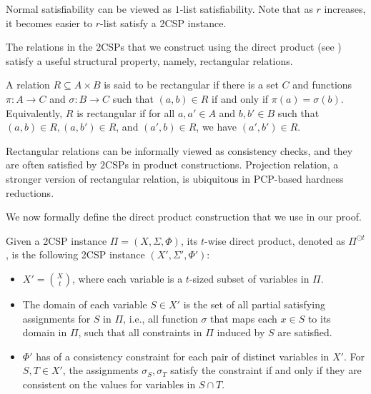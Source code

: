 Normal satisfiability can be viewed as $1$-list satisfiability. Note that as $r$ increases, it becomes easier to $r$-list satisfy a 2CSP instance. 

The relations in the $2$CSPs that we construct using the direct product (see ) satisfy a useful structural property, namely, rectangular relations. 
\begin{definition}\label{def:rect}
    A relation $R \subseteq A \times B$ is said to be rectangular if there is a set $C$ and functions $\pi: A \to C$ and $\sigma: B \to C$ such that $(a,b) \in R$ if and only if $\pi(a)=\sigma(b)$. Equivalently, $R$ is rectangular if for all $a,a' \in A$ and $b,b' \in B$ such that $(a,b)\in R, (a,b')\in R$, and $(a',b) \in R$, we have $(a',b')\in R$.
\end{definition}

Rectangular relations can be informally viewed as consistency checks, and they are often satisfied by $2$CSPs in product constructions. Projection relation, a stronger version of rectangular relation, is ubiquitous in PCP-based hardness reductions.

We now formally define the direct product construction that we use in our proof. 
\begin{definition}\label{def:prod}
    Given a 2CSP instance $\Pi=(X,\Sigma,\Phi)$, its $t$-wise direct product, denoted as $\Pi^{\odot t}$, is the following 2CSP instance $(X',\Sigma',\Phi')$:
    \begin{itemize}
        \item $X'=\binom{X}{t}$, where each variable is a $t$-sized subset of variables in $\Pi$. 
        \item The domain of each variable $S \in X'$ is the set of all partial satisfying assignments for $S$ in $\Pi$, i.e., all function $\sigma$ that maps each $x \in S$ to its domain in $\Pi$, such that all constraints in $\Pi$ induced by $S$ are satisfied.
        \item $\Phi'$ has of a consistency constraint for each pair of distinct variables in $X'$. For $S,T \in X'$, the assignments $\sigma_S,\sigma_T$  satisfy the constraint if and only if they are consistent on the values for variables in $S \cap T$.
    \end{itemize}
\end{definition}


